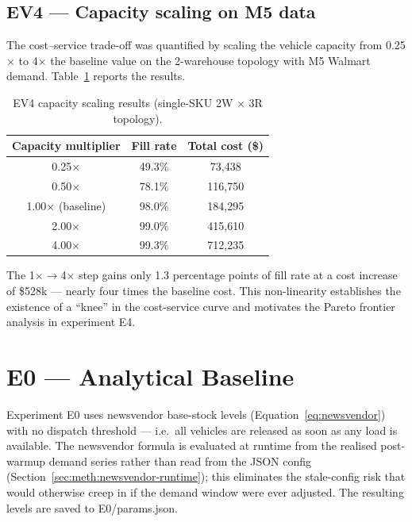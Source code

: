 \subsection{EV4 --- Capacity scaling on M5 data}
\label{sec:results:ev4}

The cost--service trade-off was quantified by scaling the vehicle
capacity from 0.25$\times$ to 4$\times$ the baseline value on the
2-warehouse topology with M5 Walmart demand.  Table~\ref{tab:ev4}
reports the results.

\begin{table}[htbp]
  \centering
  \caption{EV4 capacity scaling results (single-SKU 2W $\times$ 3R topology).}
  \label{tab:ev4}
  \begin{tabular}{@{}ccc@{}}
    \toprule
    Capacity multiplier & Fill rate & Total cost (\$) \\
    \midrule
    0.25$\times$ & 49.3\% & 73,438 \\
    0.50$\times$ & 78.1\% & 116,750 \\
    1.00$\times$ (baseline) & 98.0\% & 184,295 \\
    2.00$\times$ & 99.0\% & 415,610 \\
    4.00$\times$ & 99.3\% & 712,235 \\
    \bottomrule
  \end{tabular}
\end{table}

The 1$\times$$\to$4$\times$ step gains only 1.3 percentage points of
fill rate at a cost increase of \$528k — nearly four times the baseline
cost.  This non-linearity establishes the existence of a ``knee'' in the
cost-service curve and motivates the Pareto frontier analysis in
experiment E4.

\section{E0 --- Analytical Baseline}
\label{sec:results:e0}

Experiment E0 uses newsvendor base-stock levels (Equation~\ref{eq:newsvendor})
with no dispatch threshold — i.e.\ all vehicles are released as soon as
any load is available.  The newsvendor formula is evaluated at runtime
from the realised post-warmup demand series rather than read from the
JSON config (Section~\ref{sec:meth:newsvendor-runtime}); this eliminates
the stale-config risk that would otherwise creep in if the demand window
were ever adjusted.  The resulting levels are saved to
E0/params.json.

